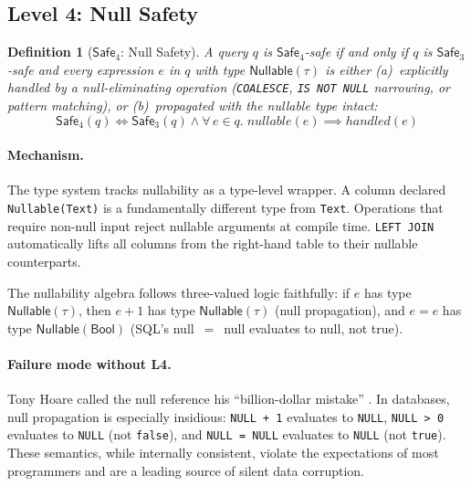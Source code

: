 \documentclass[11pt,a4paper]{article}
\newtheorem{definition}[theorem]{Definition}
\newcommand{\LevelN}[1]{\textsf{L#1}}
\newcommand{\Safe}[1]{\ensuremath{\mathsf{Safe}_{#1}}}
\begin{document}
\subsection{Level 4: Null Safety}\label{sec:L4}

\begin{definition}[\Safe{4}: Null Safety]
A query $q$ is \Safe{4}-safe if and only if $q$ is \Safe{3}-safe and
every expression $e$ in $q$ with type $\mathsf{Nullable}(\tau)$ is
either (a)~explicitly handled by a null-eliminating operation
(\texttt{COALESCE}, \texttt{IS NOT NULL} narrowing, or pattern
matching), or (b)~propagated with the nullable type intact:
\[
  \Safe{4}(q) \iff \Safe{3}(q) \land \forall\, e \in q.\;
  \mathit{nullable}(e) \implies \mathit{handled}(e)
\]
\end{definition}

\paragraph{Mechanism.}
The type system tracks nullability as a type-level wrapper.  A column
declared \texttt{Nullable(Text)} is a fundamentally different type from
\texttt{Text}.  Operations that require non-null input reject nullable
arguments at compile time.  \texttt{LEFT JOIN} automatically lifts all
columns from the right-hand table to their nullable counterparts.

The nullability algebra follows three-valued logic faithfully: if $e$
has type $\mathsf{Nullable}(\tau)$, then $e + 1$ has type
$\mathsf{Nullable}(\tau)$ (null propagation), and $e = e$ has type
$\mathsf{Nullable}(\mathsf{Bool})$ (SQL's null~$=$~null evaluates to
null, not true).

\paragraph{Failure mode without \LevelN{4}.}
Tony Hoare called the null reference his ``billion-dollar mistake''
\citep{hoare2009null}.  In databases, null propagation is especially
insidious: \texttt{NULL + 1} evaluates to \texttt{NULL},
\texttt{NULL > 0} evaluates to \texttt{NULL} (not \texttt{false}), and
\texttt{NULL = NULL} evaluates to \texttt{NULL} (not \texttt{true}).
These semantics, while internally consistent, violate the expectations
of most programmers and are a leading source of silent data corruption.
\end{document}
